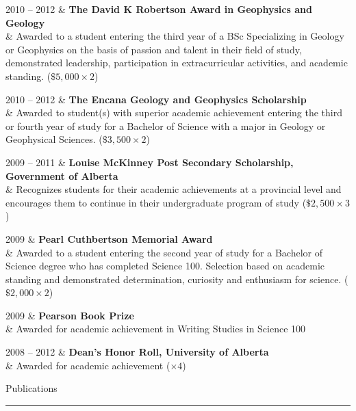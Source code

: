 \documentclass[a4paper, 11pt]{article}
\newcommand{\heading}[1]{
    \begin{minipage}[t]{\textwidth}
    \vspace{0.05cm}
    {\LARGE #1}\\
    \vspace{-0.24cm}
    \hrule
    \end{minipage}
    \vspace{0.05cm}

}
\begin{document}
\begin{entryright}
2010 -- 2012 & \textbf{The David K Robertson Award in Geophysics and Geology} \\
& Awarded to a student entering the third year of a BSc Specializing in Geology or Geophysics on the basis of passion and talent in their field of study, demonstrated leadership, participation in extracurricular activities, and academic standing. ($\$5,000 \times 2$)
\end{entryright}

\begin{entryright}
2010 -- 2012 & \textbf{The Encana Geology and Geophysics Scholarship} \\
& Awarded to student(s) with superior academic achievement entering the third or fourth year of study for a Bachelor of Science with a major in Geology or Geophysical Sciences. ($\$3,500 \times 2$)
\end{entryright}

\begin{entryright}
2009 -- 2011 & \textbf{Louise McKinney Post Secondary Scholarship, Government of Alberta} \\
& Recognizes students for their academic achievements at a provincial level and encourages them to continue in their undergraduate program of study ($\$2,500 \times 3$)
\end{entryright}

\begin{entryright}
2009 & \textbf{Pearl Cuthbertson Memorial Award} \\
& Awarded to a student entering the second year of study for a Bachelor of Science degree who has completed Science 100. Selection based on academic standing and demonstrated determination, curiosity and enthusiasm for science. ($\$2,000 \times 2$)
\end{entryright}

\begin{entryright}
2009 & \textbf{Pearson Book Prize}\\
& Awarded for academic achievement in Writing Studies in Science 100
\end{entryright}

\begin{entryright}
2008 -- 2012 & \textbf{Dean's Honor Roll, University of Alberta} \\
& Awarded for academic achievement ($\times 4$)
\end{entryright}

\heading{Publications}
\label{sec:publications}
\end{document}
